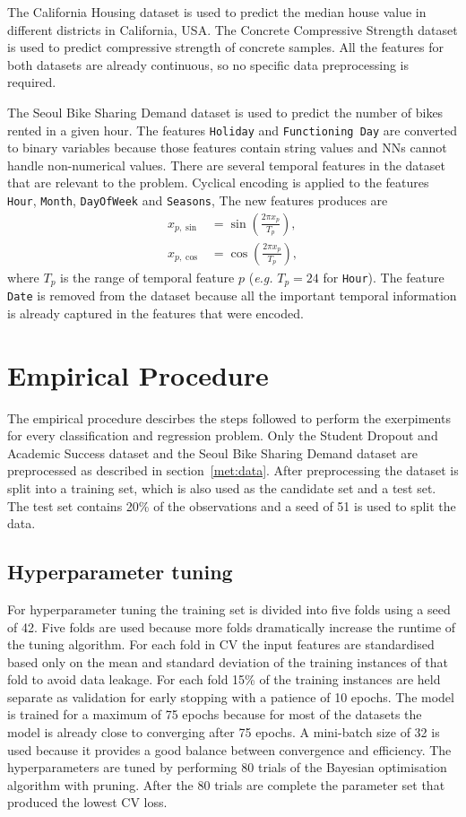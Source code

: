 \documentclass[conference]{IEEEtran}
\begin{document}
	The California Housing dataset is used to predict the median house value in different districts in California, USA. The Concrete Compressive Strength dataset is used to predict compressive strength of concrete samples. All the features for both datasets are already continuous, so no specific data preprocessing is required.
	
	The Seoul Bike Sharing Demand dataset is used to predict the number of bikes rented in a given hour. The features \texttt{Holiday} and \texttt{Functioning Day} are converted to binary variables because those features contain string values and NNs cannot handle non-numerical values. There are several temporal features in the dataset that are relevant to the problem. Cyclical encoding is applied to the features \texttt{Hour}, \texttt{Month}, \texttt{DayOfWeek} and \texttt{Seasons}, The new features produces are 
	\[
	\begin{aligned}
		x_{p,\sin} &= \sin\left(\frac{2\pi x_p}{T_p}\right), \\
		x_{p,\cos} &= \cos\left(\frac{2\pi x_p}{T_p}\right),
	\end{aligned}
	\]
	where $T_p$ is the range of temporal feature $p$ (\textsl{e.g.} $T_p = 24$ for \texttt{Hour}). The feature \texttt{Date} is removed from the dataset because all the important temporal information is already captured in the features that were encoded.
	
	\section{Empirical Procedure}
	The empirical procedure descirbes the steps followed to perform the exerpiments for every classification and regression problem. Only the Student Dropout and Academic Success dataset and the Seoul Bike Sharing Demand dataset are preprocessed as described in section~\ref{met:data}. After preprocessing the dataset is split into a training set, which is also used as the candidate set and a test set. The test set contains 20\% of the observations and a seed of 51 is used to split the data.
	
	\subsection{Hyperparameter tuning}
	For hyperparameter tuning the training set is divided into five folds using a seed of 42. Five folds are used because more folds dramatically increase the runtime of the tuning algorithm. For each fold in CV the input features are standardised based only on the mean and standard deviation of the training instances of that fold to avoid data leakage. For each fold 15\% of the training instances are held separate as validation for early stopping with a patience of 10 epochs. The model is trained for a maximum of 75 epochs because for most of the datasets the model is already close to converging after 75 epochs. A mini-batch size of 32 is used because it provides a good balance between convergence and efficiency. The hyperparameters are tuned by performing 80 trials of the Bayesian optimisation algorithm with pruning. After the 80 trials are complete the parameter set that produced the lowest CV loss.
	
\end{document}
